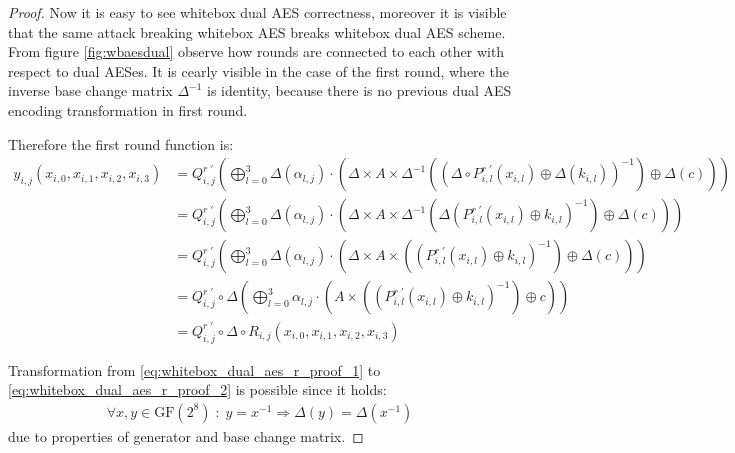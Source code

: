 \documentclass[11pt,oneside,final]{fithesis2}
\begin{document}
\begin{proof}
	Now it is easy to see whitebox dual AES correctness, moreover it is visible that the same attack breaking whitebox AES breaks whitebox dual AES scheme. From figure \ref{fig:wbaesdual}
	observe how rounds are connected to each other with respect to dual AESes. It is cearly visible in the case of the first round, where the inverse base change matrix $\Delta^{-1}$ is identity, because
	there is no previous dual AES encoding transformation in first round.

	Therefore the first round function is:
	\begin{subequations}
	\begin{align} \label{eq:whitebox_dual_aes_r_proof}
	y_{i,j}\left(x_{i,0}, x_{i,1}, x_{i,2}, x_{i,3}\right) &= Q^{r \; \prime}_{i,j}              \left( \bigoplus^3_{l=0} \Delta(\alpha_{l,j}) \cdot \left( \Delta \times A \times \Delta^{-1} \left(         \left(\Delta \circ P^{r \; \prime}_{i,l}\left(x_{i,l}\right) \oplus \Delta\left(k_{i,l}\right) \right)^{-1} \right) \oplus \Delta \left(c\right) \right) \right) \label{eq:whitebox_dual_aes_r_proof_1} \\ 
								&= Q^{r \; \prime}_{i,j}              \left( \bigoplus^3_{l=0} \Delta(\alpha_{l,j}) \cdot \left( \Delta \times A \times \Delta^{-1} \left( \Delta  \left(             P^{r \; \prime}_{i,l}\left(x_{i,l}\right) \oplus             k_{i,l}        \right)^{-1} \right) \oplus \Delta \left(c\right) \right) \right) \label{eq:whitebox_dual_aes_r_proof_2} \\
								&= Q^{r \; \prime}_{i,j}              \left( \bigoplus^3_{l=0} \Delta(\alpha_{l,j}) \cdot \left( \Delta \times A \times             \left(         \left(             P^{r \; \prime}_{i,l}\left(x_{i,l}\right) \oplus             k_{i,l}        \right)^{-1} \right) \oplus \Delta \left(c\right) \right) \right)\\
								&= Q^{r \; \prime}_{i,j} \circ \Delta \left( \bigoplus^3_{l=0}        \alpha_{l,j}  \cdot \left(               A \times             \left(         \left(             P^{r \; \prime}_{i,l}\left(x_{i,l}\right) \oplus             k_{i,l}        \right)^{-1} \right) \oplus              c        \right) \right)\\
								&= Q^{r \; \prime}_{i,j} \circ \Delta \circ R_{i,j}\left(x_{i,0}, x_{i,1}, x_{i,2}, x_{i,3}\right) \label{eq:whitebox_dual_aes_r_proof_final}
	\end{align}
	\end{subequations}

	Transformation from \ref{eq:whitebox_dual_aes_r_proof_1} to \ref{eq:whitebox_dual_aes_r_proof_2} is possible since it holds:
	\begin{align}
	    \forall x,y \in \text{GF}(2^8) \; : \; y = x^{-1} \Rightarrow \Delta \left(y\right) = \Delta \left( x^{-1} \right)
	\end{align}
	due to properties of generator and base change matrix.


\end{proof}
\end{document}
